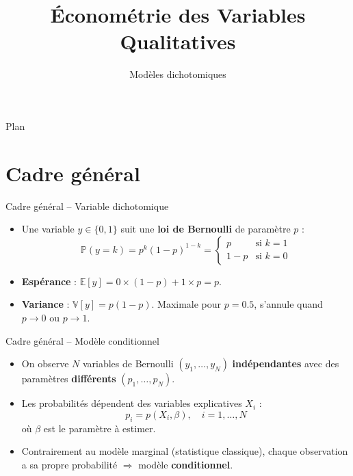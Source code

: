 \documentclass[11pt,aspectratio=169]{beamer}
\title{Économétrie des Variables Qualitatives}
\subtitle{Modèles dichotomiques}
\author{}
\date{}
\institute{}
\newcommand{\E}{\mathbb{E}}
\newcommand{\V}{\mathbb{V}}
\newcommand{\PP}{\mathbb{P}}
\begin{document}
\begin{frame}
\titlepage
\end{frame}

\begin{frame}{Plan}
\tableofcontents
\end{frame}

\section{Cadre général}

\begin{frame}{Cadre général -- Variable dichotomique}

\begin{itemize}

\item Une variable $y \in \{0, 1\}$ suit une \textbf{loi de Bernoulli} de
  paramètre $p$ :
  \[
  \PP(y = k) = p^k (1-p)^{1-k} = \begin{cases}
      p & \text{si } k = 1 \\
      1-p & \text{si } k = 0
  \end{cases}
  \]

\item \textbf{Espérance} : $\E[y] = 0 \times (1-p) + 1 \times p = p$.\newline

\item \textbf{Variance} : $\V[y] = p(1-p)$. Maximale pour $p = 0.5$,
  s'annule quand $p \to 0$ ou $p \to 1$.

\end{itemize}

\end{frame}

\begin{frame}{Cadre général -- Modèle conditionnel}

\begin{itemize}

\item On observe $N$ variables de Bernoulli $(y_1, \ldots, y_N)$
  \textbf{indépendantes} avec des paramètres \textbf{différents}
  $(p_1, \ldots, p_N)$.\newline

\item Les probabilités dépendent des variables explicatives $X_i$ :
  \[
  p_i = p(X_i, \beta), \quad i = 1, \ldots, N
  \]
  où $\beta$ est le paramètre à estimer.\newline

\item Contrairement au modèle marginal (statistique classique), chaque
  observation a sa propre probabilité $\Rightarrow$ modèle
  \textbf{conditionnel}.

\end{itemize}

\end{frame}
\end{document}
